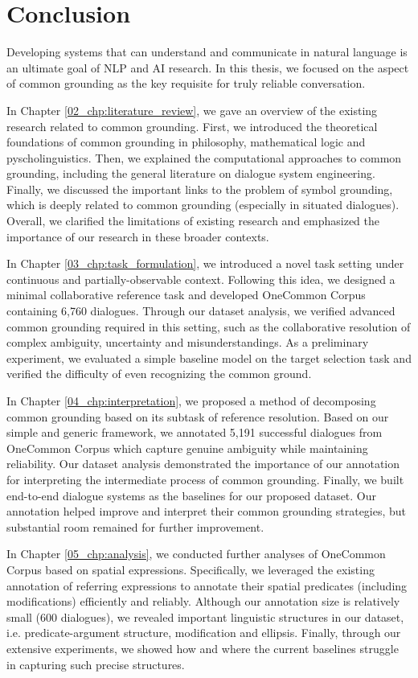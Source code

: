\chapter{Conclusion}
\label{08_chp:conclusion}

Developing systems that can understand and communicate in natural language is an ultimate goal of NLP and AI research. In this thesis, we focused on the aspect of common grounding as the key requisite for truly reliable conversation.

In Chapter \ref{02_chp:literature_review}, we gave an overview of the existing research related to common grounding. First, we introduced the theoretical foundations of common grounding in philosophy, mathematical logic and pyscholinguistics. Then, we explained the computational approaches to common grounding, including the general literature on dialogue system engineering. Finally, we discussed the important links to the problem of symbol grounding, which is deeply related to common grounding (especially in situated dialogues). Overall, we clarified the limitations of existing research and emphasized the importance of our research in these broader contexts.

In Chapter \ref{03_chp:task_formulation}, we introduced a novel task setting under continuous and partially-observable context. Following this idea, we designed a minimal collaborative reference task and developed OneCommon Corpus containing 6,760 dialogues. Through our dataset analysis, we verified advanced common grounding required in this setting, such as the  collaborative resolution of complex ambiguity, uncertainty and misunderstandings. As a preliminary experiment, we evaluated a simple baseline model on the target selection task and verified the difficulty of even recognizing the common ground. 

In Chapter \ref{04_chp:interpretation}, we proposed a method of decomposing common grounding based on its subtask of reference resolution. Based on our simple and generic framework, we annotated 5,191 successful dialogues from OneCommon Corpus which capture genuine ambiguity while maintaining reliability. Our dataset analysis demonstrated the importance of our annotation for interpreting the intermediate process of common grounding. Finally, we built end-to-end dialogue systems as the baselines for our proposed dataset. Our annotation helped improve and interpret their common grounding strategies, but substantial room remained for further improvement.

In Chapter \ref{05_chp:analysis}, we conducted further analyses of OneCommon Corpus based on spatial expressions. Specifically, we leveraged the existing annotation of referring expressions to annotate their spatial predicates (including modifications) efficiently and reliably. Although our annotation size is relatively small (600 dialogues), we revealed important linguistic structures in our dataset, i.e. predicate-argument structure, modification and ellipsis. Finally, through our extensive experiments, we showed how and where the current baselines struggle in capturing such precise structures.

